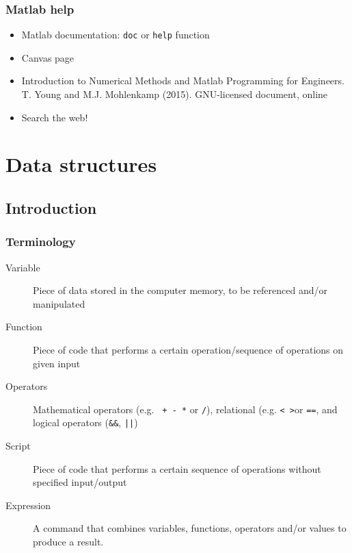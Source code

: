 \documentclass[11pt,table,final,fleqn,xcolor={usenames,dvipsnames},unknownkeysallowed,handout]{beamer}
\begin{document}
\begin{frame}
\frametitle{Matlab help}
\begin{itemize}[<+->]
  \item Matlab documentation: \lstinline$doc$ or \lstinline$help$ function
  \item Canvas page
  \item Introduction to Numerical Methods and Matlab Programming for Engineers. T. Young and M.J. Mohlenkamp (2015). GNU-licensed document, online
  \item Search the web!
\end{itemize}
\vspace{-2em}
\flushright{}
\end{frame}
%
\section{Data structures}
\subsection*{Introduction}
\begin{frame}
 \frametitle{Terminology}
 \begin{description}
  \item[Variable] Piece of data stored in the computer memory, to be referenced and/or manipulated
  \item[Function] Piece of code that performs a certain operation/sequence of operations on given input
  \item[Operators] Mathematical operators (e.g. \lstinline$ + - *$ or \lstinline$/$), relational (e.g. \lstinline$< >$or \lstinline$==$, and logical operators (\lstinline$&&$, \lstinline$||$)
  \item[Script] Piece of code that performs a certain sequence of operations without specified input/output
  \item[Expression] A command that combines variables, functions, operators and/or values to produce a result.
 \end{description}
\end{frame}
\end{document}
